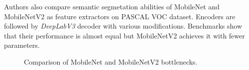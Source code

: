 Authors also compare semantic segmetation abilities of MobileNet and MobileNetV2 as
feature extractors on PASCAL VOC dataset. Encoders are followed by \textit{DeepLabV3}
decoder \cite{bib:chen2017rethinking} with various modifications. Benchmarks show that
their performance is almost equal but MobileNetV2 achieves it with fewer parameters.

\begin{figure}[h]
	\begin{center}
		\quad
	\end{center}
	\caption[Comparison of MobileNet and MobileNetV2 bottlenecks]{Comparison of MobileNet and MobileNetV2 bottlenecks.}
	\label{img:mobilenet_bottlenecks}
\end{figure}

